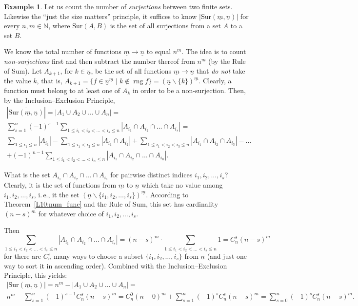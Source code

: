 \documentclass[12pt,notitlepage]{article}
\theoremstyle{plain}
\theoremstyle{definition}
\newtheorem{exm}[thm]{Example}
\theoremstyle{plain}
\newcommand{\N}{\mathbb{N}}
\renewcommand{\setminus}{\smallsetminus}
\newcommand{\rng}{\mathop{\mathrm{rng}}}
\newcommand{\ul}[1]{\underline{#1}}
\newcommand{\1}{\mathbf{1}}
\newcommand{\0}{\mathbf{0}}
\begin{document}
\begin{exm}
Let us count the number of \emph{surjections} between two finite sets. Likewise the ``just the size matters'' principle, it suffices to know $|\mathrm{Sur}(\ul{m},\ul{n})|$ for every $n, m \in \N$, where $\mathrm{Sur}(A,B)$ is the set of all surjections from a set $A$ to a set $B$.

We know the total number of functions $\ul{m} \to \ul{n}$ to equal $n^m$. The idea is to count \emph{non-surjections} first and then subtract the number thereof from $n^m$ (by the Rule of Sum).  Let $A_{k + 1}$, for $k \in \ul{n}$, be the set of all functions $\ul{m} \to \ul{n}$ that \emph{do not} take the value $k$, that is, $A_{k + 1} = \{ f \in \ul{n}^{\ul{m}} \mid k \notin \rng f \} = (\ul{n} \setminus \{k\})^{\ul{m}}$. Clearly, a function must belong to at least one of $A_k$ in order to be a non-surjection. Then, by the Inclusion--Exclusion Principle,
\begin{multline*}
|\overline{\mathrm{Sur}(\ul{m},\ul{n})}| = |A_1 \cup A_2 \cup \ldots \cup  A_n| =\\
\sum\limits_{s = 1}^n (-1)^{s - 1} \sum\limits_{1\leqslant i_1 < i_2 < \ldots < i_s \leqslant n} |A_{i_1} \cap A_{i_2} \cap \ldots \cap A_{i_s}| =\\
\sum\limits_{1\leqslant i_1 \leqslant n} |A_{i_1}| - \sum\limits_{1\leqslant i_1 < i_2 \leqslant n} |A_{i_1} \cap A_{i_2}| + \sum\limits_{1\leqslant i_1 < i_2 < i_3 \leqslant n} |A_{i_1} \cap A_{i_2} \cap A_{i_3}| - \ldots\\
+ (-1)^{n - 1} \sum\limits_{1\leqslant i_1 < i_2 < \ldots < i_n \leqslant n} |A_{i_1} \cap A_{i_2} \cap \ldots \cap A_{i_n}|.
\end{multline*}
\end{exm}
What is the set $A_{i_1} \cap A_{i_2} \cap \ldots \cap  A_{i_s}$ for pairwise distinct indices $i_1, i_2, \ldots, i_s$? Clearly, it is the set of functions from $\ul{m}$ to $\ul{n}$ which take no value among $i_1, i_2, \ldots, i_s$, i.\,e., it the set $(\ul{n} \setminus \{ i_1, i_2, \ldots, i_s \})^{\ul{m}}$. According to Theorem~\ref{L10:num_func} and the Rule of Sum, this set has cardinality $(n - s)^m$ for whatever choice of $i_1, i_2, \ldots, i_s$.

Then
$$\sum\limits_{1\leqslant i_1 < i_2 < \ldots  < i_s \leqslant n} |A_{i_1} \cap A_{i_2} \cap \ldots \cap A_{i_s}| = (n - s)^m \cdot \sum\limits_{1\leqslant i_1 < i_2 < \ldots  < i_s \leqslant n} 1 = C_n^s (n-s)^m$$
for there are $C_n^s$ many ways to choose a subset $\{ i_1, i_2, \ldots, i_s \}$ from $\ul{n}$ (and just one way to sort it in ascending order). Combined with the Inclusion--Exclusion Principle, this yields:
\begin{multline*}
|\mathrm{Sur}(\ul{m},\ul{n})| = n^m - |A_1 \cup A_2 \cup \ldots \cup A_n| =\\
n^m - \sum\limits_{s = 1}^{n} (-1)^{s - 1} C_n^s (n-s)^m = C_n^0 (n - 0)^m + \sum\limits_{s = 1}^{n} (-1)^{s} C_n^s (n-s)^m = \sum\limits_{s = 0}^{n} (-1)^{s} C_n^s (n-s)^m.
\end{multline*}
\end{document}
